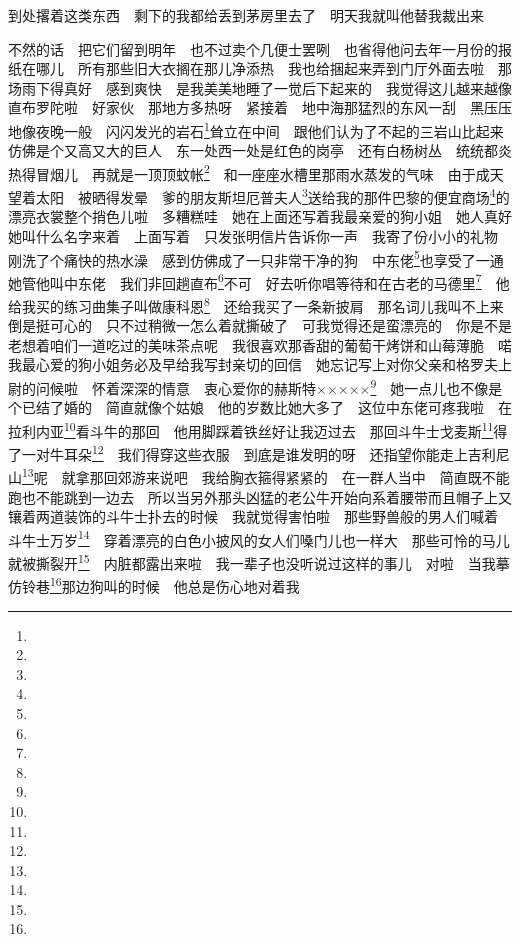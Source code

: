 \par 到处撂着这类东西　剩下的我都给丢到茅房里去了　明天我就叫他替我裁出来　
\par 不然的话　把它们留到明年　也不过卖个几便士罢咧　也省得他问去年一月份的报纸在哪儿　所有那些旧大衣搁在那儿净添热　我也给捆起来弄到门厅外面去啦　那场雨下得真好　感到爽快　是我美美地睡了一觉后下起来的　我觉得这儿越来越像直布罗陀啦　好家伙　那地方多热呀　紧接着　地中海那猛烈的东风一刮　黑压压地像夜晚一般　闪闪发光的岩石\footnote{}耸立在中间　跟他们认为了不起的三岩山比起来　仿佛是个又高又大的巨人　东一处西一处是红色的岗亭　还有白杨树丛　统统都炎热得冒烟儿　再就是一顶顶蚊帐\footnote{}　和一座座水槽里那雨水蒸发的气味　由于成天望着太阳　被晒得发晕　爹的朋友斯坦厄普夫人\footnote{}送给我的那件巴黎的便宜商场\footnote{}的漂亮衣裳整个捎色儿啦　多糟糕哇　她在上面还写着我最亲爱的狗小姐　她人真好　她叫什么名字来着　上面写着　只发张明信片告诉你一声　我寄了份小小的礼物　刚洗了个痛快的热水澡　感到仿佛成了一只非常干净的狗　中东佬\footnote{}也享受了一通　她管他叫中东佬　我们非回趟直布\footnote{}不可　好去听你唱等待和在古老的马德里\footnote{}　他给我买的练习曲集子叫做康科恩\footnote{}　还给我买了一条新披肩　那名词儿我叫不上来　倒是挺可心的　只不过稍微一怎么着就撕破了　可我觉得还是蛮漂亮的　你是不是老想着咱们一道吃过的美味茶点呢　我很喜欢那香甜的葡萄干烤饼和山莓薄脆　喏　我最心爱的狗小姐务必及早给我写封亲切的回信　她忘记写上对你父亲和格罗夫上尉的问候啦　怀着深深的情意　衷心爱你的赫斯特×××××\footnote{}　她一点儿也不像是个已结了婚的　简直就像个姑娘　他的岁数比她大多了　这位中东佬可疼我啦　在拉利内亚\footnote{}看斗牛的那回　他用脚踩着铁丝好让我迈过去　那回斗牛士戈麦斯\footnote{}得了一对牛耳朵\footnote{}　我们得穿这些衣服　到底是谁发明的呀　还指望你能走上吉利尼山\footnote{}呢　就拿那回郊游来说吧　我给胸衣箍得紧紧的　在一群人当中　简直既不能跑也不能跳到一边去　所以当另外那头凶猛的老公牛开始向系着腰带而且帽子上又镶着两道装饰的斗牛士扑去的时候　我就觉得害怕啦　那些野兽般的男人们喊着　斗牛士万岁\footnote{}　穿着漂亮的白色小披风的女人们嗓门儿也一样大　那些可怜的马儿就被撕裂开\footnote{}　内脏都露出来啦　我一辈子也没听说过这样的事儿　对啦　当我摹仿铃巷\footnote{}那边狗叫的时候　他总是伤心地对着我　
